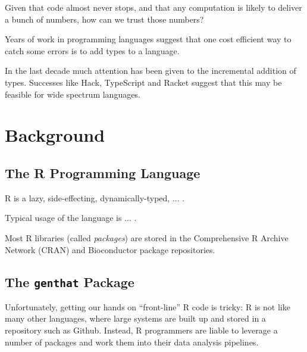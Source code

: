 \documentclass[acmsmall,10pt,review,anonymous]{acmart}\settopmatter{printfolios=true,printccs=false,printacmref=false}
\begin{document}
Given that code almost never stops, and that any computation is likely to deliver a bunch of numbers, how can we trust those numbers?

Years of work in programming languages suggest that one cost efficient way to catch some errors is to add types to a language.

In the last decade much attention has been given to the incremental addition of types. Successes like Hack, TypeScript and Racket suggest that this may be feasible for wide spectrum languages. 



%
%
%
\section{Background}

%
%
%
%
\subsection{The R Programming Language}

R is a lazy, side-effecting, dynamically-typed, ... .

Typical usage of the language is ... . 

Most R libraries (called \textit{packages}) are stored in the Comprehensive R Archive Network (CRAN) and Bioconductor package repositories.



%
%
\subsection{The \texttt{genthat} Package}

Unfortunately, getting our hands on ``front-line'' R code is tricky:
R is not like many other languages, where large systems are built up and stored in a repository such as Github.
Instead, R programmers are liable to leverage a number of packages and work them into their data analysis pipelines.
\end{document}
